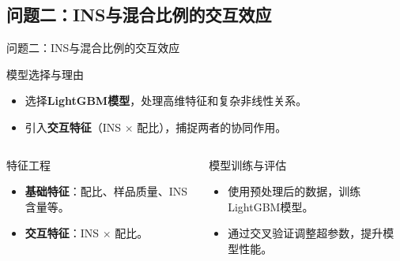 \documentclass{beamer}
\begin{document}
\subsection{问题二：INS与混合比例的交互效应}
\begin{frame}{问题二：INS与混合比例的交互效应}
    \justifying
    \begin{block}{模型选择与理由}
        \begin{itemize}
            \item 选择\textbf{LightGBM模型}，处理高维特征和复杂非线性关系。
            \item 引入\textbf{交互特征}（INS $\times$ 配比），捕捉两者的协同作用。
        \end{itemize}
    \end{block}
    \begin{columns}
        \begin{block}{特征工程}
            \begin{itemize}
                \item \textbf{基础特征}：配比、样品质量、INS含量等。
                \item \textbf{交互特征}：INS $\times$ 配比。
            \end{itemize}
        \end{block}
        \begin{block}{模型训练与评估}
            \begin{itemize}
                \item 使用预处理后的数据，训练LightGBM模型。
                \item 通过交叉验证调整超参数，提升模型性能。
            \end{itemize}
        \end{block}
    \end{columns}
\end{frame}
\end{document}
